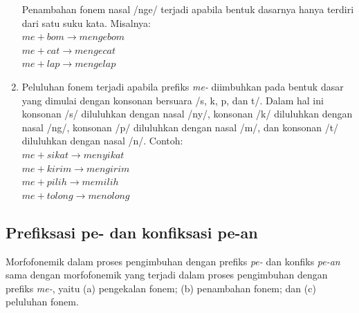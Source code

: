 \begin{enumerate}
	Penambahan fonem nasal /nge/ terjadi apabila bentuk dasarnya hanya terdiri dari satu suku kata. Misalnya:\\
	$me + bom \rightarrow mengebom$\\
	$me + cat \rightarrow mengecat$\\
	$me + lap \rightarrow mengelap$
	
	\item Peluluhan fonem terjadi apabila prefiks \textit{me-} diimbuhkan pada bentuk dasar yang dimulai dengan konsonan bersuara /s, k, p, dan t/. Dalam hal ini konsonan /s/ diluluhkan dengan nasal /ny/, konsonan /k/ diluluhkan dengan nasal /ng/, konsonan /p/ diluluhkan dengan nasal /m/, dan konsonan /t/ diluluhkan dengan nasal /n/. Contoh:\\
	$me + sikat \rightarrow menyikat$\\
	$me + kirim \rightarrow mengirim$\\
	$me + pilih \rightarrow memilih$\\
	$me + tolong \rightarrow menolong$
	
\end{enumerate}


\subsection{Prefiksasi pe- dan konfiksasi pe-an}
\label{sec:prefiksasiPe-}

Morfofonemik dalam proses pengimbuhan dengan prefiks \textit{pe-} dan konfiks \textit{pe-an} sama dengan morfofonemik yang terjadi dalam proses pengimbuhan dengan prefiks \textit{me-}, yaitu (a) pengekalan fonem; (b) penambahan fonem; dan (c) peluluhan fonem.

